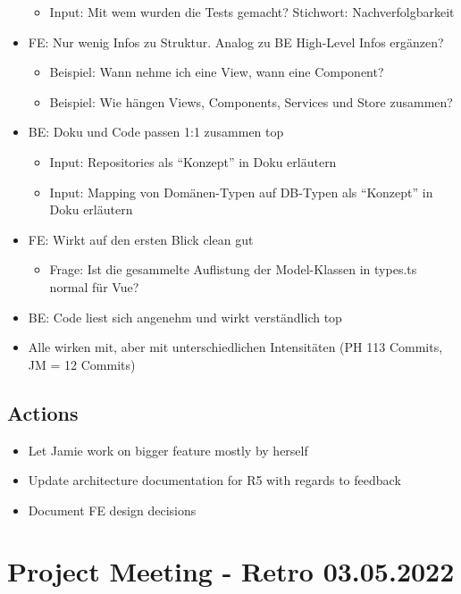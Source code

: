 \begin{itemize}
    \begin{itemize}
        \item Input: Mit wem wurden die Tests gemacht?
        Stichwort: Nachverfolgbarkeit
    \end{itemize}
    \item FE: Nur wenig Infos zu Struktur.
    Analog zu BE High-Level Infos ergänzen?
    \begin{itemize}
        \item Beispiel: Wann nehme ich eine View, wann eine Component?
        \item Beispiel: Wie hängen Views, Components, Services und Store zusammen?
    \end{itemize}
    \item BE: Doku und Code passen 1:1 zusammen \textrightarrow top
    \begin{itemize}
        \item Input: Repositories als ``Konzept'' in Doku erläutern
        \item Input: Mapping von Domänen-Typen auf DB-Typen als ``Konzept'' in Doku erläutern
    \end{itemize}
    \item FE: Wirkt auf den ersten Blick clean \textrightarrow gut
    \begin{itemize}
        \item Frage: Ist die gesammelte Auflistung der Model-Klassen in types.ts normal für Vue?
    \end{itemize}
    \item BE: Code liest sich angenehm und wirkt verständlich \textrightarrow top
    \item Alle wirken mit, aber mit unterschiedlichen Intensitäten (PH 113 Commits, JM = 12 Commits)
\end{itemize}

\subsection{Actions}

\begin{itemize}
    \item Let Jamie work on bigger feature mostly by herself
    \item Update architecture documentation for R5 with regards to feedback
    \item Document FE design decisions
\end{itemize}


\section{Project Meeting - Retro 03.05.2022}

